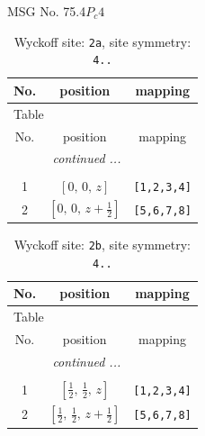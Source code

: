 \documentclass[fleqn,8pt]{jsarticle}
\begin{document}
\setcounter{MaxMatrixCols}{32}

\renewcommand{\tablename}{Table~}
\renewcommand{\figurename}{Figure~}
\begin{center}
\LARGE
MSG No. 75.4\quad$P_{c}4$
\end{center}
\renewcommand{\arraystretch}{1.2}
\begin{longtable}{ccc}
\caption{Wyckoff site: {\tt 2a}, site symmetry: {\tt 4..}}
 \\
 \hline \hline
No. & position & mapping \\ \hline \endfirsthead

\multicolumn{2}{l}{\tablename\ \thetable{}} \\
 \hline \hline
No. & position & mapping \\ \hline \endhead

 \hline \hline
\multicolumn{2}{r}{\footnotesize\it continued ...} \\ \endfoot

 \hline \hline
\multicolumn{2}{r}{} \\ \endlastfoot

1 & $\left[ 0,\, 0,\, z \right]$ & {\tt [1,2,3,4]} \\ \hline
2 & $\left[ 0,\, 0,\, z + \frac{1}{2} \right]$ & {\tt [5,6,7,8]} \\
\end{longtable}
\renewcommand{\arraystretch}{1.2}
\begin{longtable}{ccc}
\caption{Wyckoff site: {\tt 2b}, site symmetry: {\tt 4..}}
 \\
 \hline \hline
No. & position & mapping \\ \hline \endfirsthead

\multicolumn{2}{l}{\tablename\ \thetable{}} \\
 \hline \hline
No. & position & mapping \\ \hline \endhead

 \hline \hline
\multicolumn{2}{r}{\footnotesize\it continued ...} \\ \endfoot

 \hline \hline
\multicolumn{2}{r}{} \\ \endlastfoot

1 & $\left[ \frac{1}{2},\, \frac{1}{2},\, z \right]$ & {\tt [1,2,3,4]} \\ \hline
2 & $\left[ \frac{1}{2},\, \frac{1}{2},\, z + \frac{1}{2} \right]$ & {\tt [5,6,7,8]} \\
\end{longtable}
\end{document}
